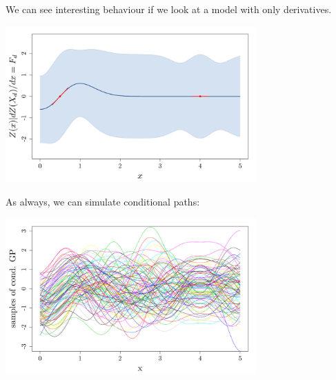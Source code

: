 \begin{frame}{}
We can see interesting behaviour if we look at a model with only derivatives.
	\begin{center}
	\includegraphics[height=6cm]{3_gaussian_process_regression/figures/R/exotic_deronly}
	\end{center}
\end{frame}

\begin{frame}{}
As always, we can simulate conditional paths:
	\begin{center}
	\includegraphics[height=6cm]{3_gaussian_process_regression/figures/R/exotic_simul}
	\end{center}
\end{frame}

